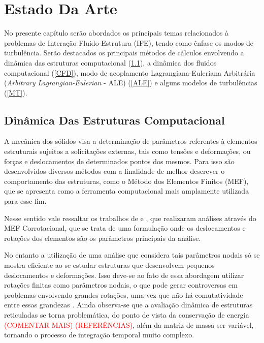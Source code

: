 \documentclass[_ArquivoPrincipal.tex]{subfiles}
\begin{document}
\chapter{Estado Da Arte}
	
No presente capítulo serão abordados os principais temas relacionados à problemas de Interação Fluido-Estrutura (IFE), tendo como ênfase os modos de turbulência. Serão destacados os principais métodos de cálculos envolvendo a dinâmica das estruturas computacional (\ref{CSD}), a dinâmica dos fluidos computacional (\ref{CFD}), modo de acoplamento Lagrangiana-Euleriana Arbitrária (\textit{Arbitrary Lagrangian-Eulerian} - ALE) (\ref{ALE}) e alguns modelos de turbulências (\ref{MT}).

\section{Dinâmica Das Estruturas Computacional} \label{CSD}

A mecânica dos sólidos visa a determinação de parâmetros referentes à elementos estruturais sujeitos a solicitações externas, tais como tensões e deformações, ou forças e deslocamentos de determinados pontos dos mesmos. Para isso são desenvolvidos diversos métodos com a finalidade de melhor descrever o comportamento das estruturas, como o Método dos Elementos Finitos (MEF), que se apresenta como a ferramenta computacional mais amplamente utilizada para esse fim.

Nesse sentido vale ressaltar os trabalhos de  e , que realizaram análises através do MEF Corrotacional, que se trata de uma formulação onde os deslocamentos e rotações dos elementos são os parâmetros principais da análise.

No entanto a utilização de uma análise que considera tais parâmetros nodais só se mostra eficiente ao se estudar estruturas que desenvolvem pequenos deslocamentos e deformações. Isso deve-se ao fato de essa abordagem utilizar rotações finitas como parâmetros nodais, o que pode gerar controversas em problemas envolvendo grandes rotações, uma vez que não há comutatividade entre essas grandezas \cite{sanches2013unconstrained}. Ainda observa-se que a avaliação dinâmica de estruturas reticuladas se torna problemática, do ponto de vista da conservação de energia \textcolor{red}{(COMENTAR MAIS) (REFERÊNCIAS)}, além da matriz de massa ser variável, tornando o processo de integração temporal muito complexo.
\end{document}
